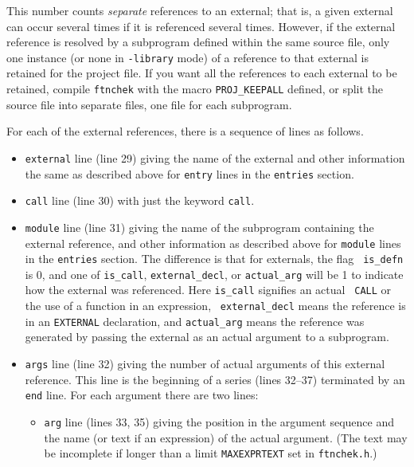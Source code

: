 \documentclass{article}
\begin{document}
This number counts \emph{separate} references to an external; that is,
a given external can occur several times if it is referenced several
times.  However, if the external reference is resolved by a subprogram
defined within the same source file, only one instance (or none in
{\tt -library} mode) of a reference to that external is retained for
the project file.  If you want all the references to each external to
be retained, compile {\tt ftnchek} with the macro {\tt PROJ\_KEEPALL}
defined, or split the source file into separate files, one file for
each subprogram.

For each of the external references, there is a sequence of lines as
follows.
\begin{itemize}

  \item {\tt external} line (line 29) giving the name of the external
     and other information the same as described above for {\tt entry} lines
     in the {\tt entries} section.

  \item {\tt call} line (line 30) with just the keyword {\tt call}.

  \item {\tt module} line (line 31) giving the name of the subprogram
     containing the external reference, and other information as
     described above for {\tt module} lines in the {\tt entries} section.
     The difference is that for  externals, the flag {\tt
     is\_defn} is 0, and one of {\tt is\_call}, {\tt external\_decl},
     or {\tt actual\_arg} will be 1 to indicate how the external was
     referenced.  Here {\tt is\_call} signifies an actual {\tt
     CALL} or the use of a function in an expression, {\tt
     external\_decl} means the reference is in an {\tt EXTERNAL}
     declaration, and {\tt actual\_arg} means the reference was
     generated by passing the external as an actual argument to a
     subprogram.

  \item {\tt args} line (line 32) giving the number of actual
     arguments of this external reference.  This line is the beginning
     of a series (lines 32--37) terminated by an {\tt end} line.  For
     each argument there are two lines:

  \begin{itemize}

    \item {\tt arg} line (lines 33, 35) giving the position in the
	argument sequence and the name (or text if an expression) of
	the actual argument.  (The text may be incomplete if longer
	than a limit {\tt MAXEXPRTEXT} set in {\tt ftnchek.h}.)


\end{itemize}
\end{itemize}
\end{document}
